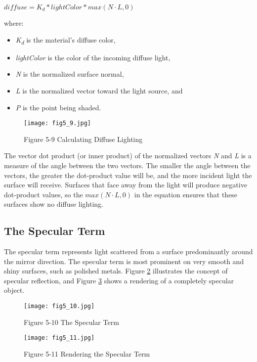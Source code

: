 \documentclass[../main.tex]{subfiles}
\begin{document}
$diffuse = K_d * lightColor * max(N \cdot L, 0)$

where:

\begin{itemize}
\item \textit{K\textsubscript{d}} is the material's diffuse color,
\item \textit{lightColor} is the color of the incoming diffuse light,
\item \textit{N} is the normalized surface normal,
\item \textit{L} is the normalized vector toward the light source, and
\item \textit{P} is the point being shaded.
\end{itemize}

\begin{figure}
    \centering
    \texttt{[image: fig5\_9.jpg]}
    \caption{Figure 5-9 Calculating Diffuse Lighting}
    \label{fig:5-9}
\end{figure}

The vector dot product (or inner product) of the normalized vectors \textit{N} and \textit{L} is a measure of the angle between the two vectors. The smaller the angle between the vectors, the greater the dot-product value will be, and the more incident light the surface will receive. Surfaces that face away from the light will produce negative dot-product values, so the $max(N \cdot L, 0)$ in the equation ensures that these surfaces show no diffuse lighting.

\subsection*{The Specular Term}

The specular term represents light scattered from a surface predominantly around the mirror direction. The specular term is most prominent on very smooth and shiny surfaces, such as polished metals. Figure \ref{fig:5-10} illustrates the concept of specular reflection, and Figure \ref{fig:5-11} shows a rendering of a completely specular object.

\begin{figure}
    \centering
    \texttt{[image: fig5\_10.jpg]}
    \caption{Figure 5-10 The Specular Term}
    \label{fig:5-10}
\end{figure}

\begin{figure}
    \centering
    \texttt{[image: fig5\_11.jpg]}
    \caption{Figure 5-11 Rendering the Specular Term}
    \label{fig:5-11}
\end{figure}
\end{document}
